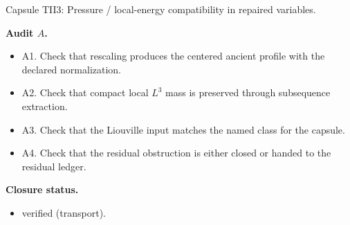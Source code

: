 \documentclass[11pt]{amsart}
\newcommand{\capsulefield}[1]{\par\smallskip\noindent\textbf{#1.}\ }
\begin{document}
\begin{proofcapsule}{Capsule TII3: Pressure / local-energy compatibility in repaired variables.}
  \capsulefield{Audit \(A\)}
  \begin{itemize}[leftmargin=1.8em]
  \item A1. Check that rescaling produces the centered ancient profile with the declared normalization.
  \item A2. Check that compact local $L^3$ mass is preserved through subsequence extraction.
  \item A3. Check that the Liouville input matches the named class for the capsule.
  \item A4. Check that the residual obstruction is either closed or handed to the residual ledger.
  \end{itemize}
  \capsulefield{Closure status}
  \begin{itemize}[leftmargin=1.8em]
  \item verified (transport).
  \end{itemize}
\end{proofcapsule}
\end{document}
